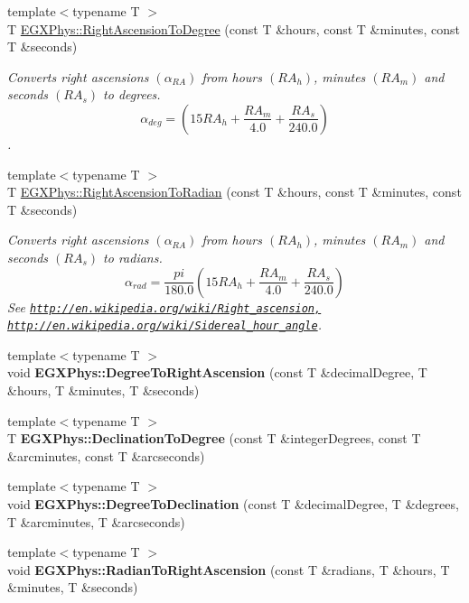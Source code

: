 \begin{DoxyCompactItemize}
\item 
{\footnotesize template$<$typename T $>$ }\\T \mbox{\hyperlink{group___e_g_x_phys-_right_ascension_and_declination_ga30e95e529dac871efc014c8ca0108c0d}{E\+G\+X\+Phys\+::\+Right\+Ascension\+To\+Degree}} (const T \&hours, const T \&minutes, const T \&seconds)
\begin{DoxyCompactList}\small\item\em Converts right ascensions $(\alpha_{RA})$ from hours $(RA_h)$, minutes $(RA_m)$ and seconds $(RA_s)$ to degrees. \[\alpha_{deg}=(15 RA_h + \frac{RA_m}{4.0} + \frac{RA_s}{240.0})\]. \end{DoxyCompactList}\item 
{\footnotesize template$<$typename T $>$ }\\T \mbox{\hyperlink{group___e_g_x_phys-_right_ascension_and_declination_gad90de181361375b745a9b226fa13ba14}{E\+G\+X\+Phys\+::\+Right\+Ascension\+To\+Radian}} (const T \&hours, const T \&minutes, const T \&seconds)
\begin{DoxyCompactList}\small\item\em Converts right ascensions $(\alpha_{RA})$ from hours $(RA_h)$, minutes $(RA_m)$ and seconds $(RA_s)$ to radians. \[\alpha_{rad}=\frac{pi}{180.0}(15 RA_h + \frac{RA_m}{4.0} + \frac{RA_s}{240.0})\] See \href{http://en.wikipedia.org/wiki/Right_ascension,}{\tt http\+://en.\+wikipedia.\+org/wiki/\+Right\+\_\+ascension,} \href{http://en.wikipedia.org/wiki/Sidereal_hour_angle}{\tt http\+://en.\+wikipedia.\+org/wiki/\+Sidereal\+\_\+hour\+\_\+angle}. \end{DoxyCompactList}\item 
{\footnotesize template$<$typename T $>$ }\\void {\bfseries E\+G\+X\+Phys\+::\+Degree\+To\+Right\+Ascension} (const T \&decimal\+Degree, T \&hours, T \&minutes, T \&seconds)
\item 
{\footnotesize template$<$typename T $>$ }\\T {\bfseries E\+G\+X\+Phys\+::\+Declination\+To\+Degree} (const T \&integer\+Degrees, const T \&arcminutes, const T \&arcseconds)
\item 
{\footnotesize template$<$typename T $>$ }\\void {\bfseries E\+G\+X\+Phys\+::\+Degree\+To\+Declination} (const T \&decimal\+Degree, T \&degrees, T \&arcminutes, T \&arcseconds)
\item 
{\footnotesize template$<$typename T $>$ }\\void {\bfseries E\+G\+X\+Phys\+::\+Radian\+To\+Right\+Ascension} (const T \&radians, T \&hours, T \&minutes, T \&seconds)

\end{DoxyCompactItemize}
